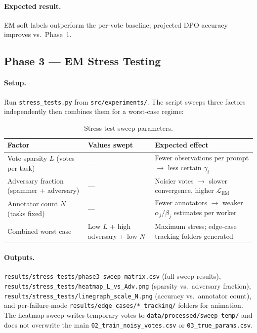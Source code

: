 \documentclass[11pt, a4paper]{article}
\begin{document}
\paragraph{Expected result.}
EM soft labels outperform the per-vote baseline; projected DPO accuracy improves vs.\ Phase~1.

\subsection{Phase 3 --- EM Stress Testing}
\label{sec:phase3-stress}

\paragraph{Setup.}
Run \texttt{stress\_tests.py} from \texttt{src/experiments/}. The script sweeps three
factors independently then combines them for a worst-case regime:

\begin{table}[H]
  \centering
  \caption{Stress-test sweep parameters.}
  \label{tab:stress}
  \begin{tabular}{p{3.2cm}p{3cm}p{6cm}}
    \toprule
    \textbf{Factor} & \textbf{Values swept} & \textbf{Expected effect} \\
    \midrule
    Vote sparsity $L$ (votes per task)
      & ---
      & Fewer observations per prompt $\to$ less certain $\gamma_i$ \\
    Adversary fraction (spammer + adversary)
      & ---
      & Noisier votes $\to$ slower convergence, higher $\mathcal{L}_\text{EM}$ \\
    Annotator count $N$ (tasks fixed)
      & ---
      & Fewer annotators $\to$ weaker $\alpha_j/\beta_j$ estimates per worker \\
    Combined worst case
      & Low $L$ + high adversary + low $N$
      & Maximum stress; edge-case tracking folders generated \\
    \bottomrule
  \end{tabular}
\end{table}

\paragraph{Outputs.}
\texttt{results/stress\_tests/phase3\_sweep\_matrix.csv} (full sweep results),
\texttt{results/stress\_tests/heatmap\_L\_vs\_Adv.png} (sparsity vs.\ adversary fraction),
\texttt{results/stress\_tests/linegraph\_scale\_N.png} (accuracy vs.\ annotator count),
and per-failure-mode \texttt{results/edge\_cases/*\_tracking/} folders for animation.
The heatmap sweep writes temporary votes to \texttt{data/processed/sweep\_temp/} and does
not overwrite the main \texttt{02\_train\_noisy\_votes.csv} or \texttt{03\_true\_params.csv}.
\end{document}
